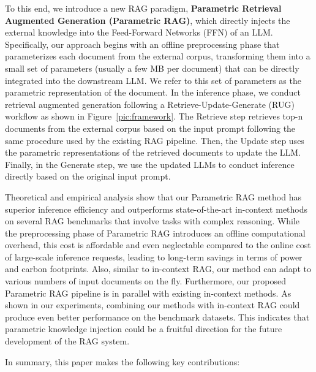 \documentclass[sigconf,natbib=true,anonymous=false]{acmart}
\begin{document}
To this end, we introduce a new RAG paradigm, \textbf{Parametric Retrieval Augmented Generation (Parametric RAG)}, which directly injects the external knowledge into the Feed-Forward Networks (FFN) of an LLM.
Specifically, our approach begins with an offline preprocessing phase that parameterizes each document from the external corpus, transforming them into a small set of parameters (usually a few MB per document) that can be directly integrated into the downstream LLM. We refer to this set of parameters as the parametric representation of the document. 
In the inference phase, we conduct retrieval augmented generation following a Retrieve-Update-Generate (RUG) workflow as shown in Figure~\ref{pic:framework}. 
The Retrieve step retrieves top-n documents from the external corpus based on the input prompt following the same procedure used by the existing RAG pipeline. Then, the Update step uses the parametric representations of the retrieved documents to update the LLM. Finally, in the Generate step, we use the updated LLMs to conduct inference directly based on the original input prompt.


Theoretical and empirical analysis show that our Parametric RAG method has superior inference efficiency and outperforms state-of-the-art in-context methods on several RAG benchmarks that involve tasks with complex reasoning. 
While the preprocessing phase of Parametric RAG introduces an offline computational overhead, this cost is affordable and even neglectable compared to the online cost of large-scale inference requests, leading to long-term savings in terms of power and carbon footprints.
Also, similar to in-context RAG, our method can adapt to various numbers of input documents on the fly. Furthermore, our proposed Parametric RAG pipeline is in parallel with existing in-context methods. As shown in our experiments, combining our methods with in-context RAG could produce even better performance on the benchmark datasets. This indicates that parametric knowledge injection could be a fruitful direction for the future development of the RAG system.








In summary, this paper makes the following key contributions:
\vspace{-0.5mm}
\end{document}
